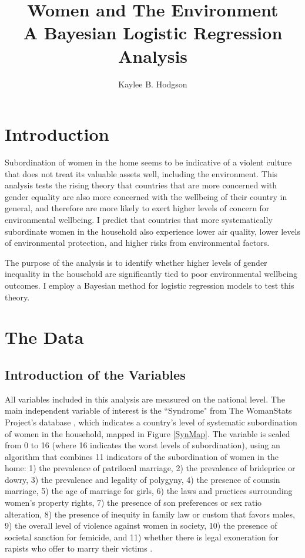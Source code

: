 \documentclass[letterpaper,10.5pt]{article}
\begin{document}
\title{Women and The Environment \\
      \large{A Bayesian Logistic Regression Analysis}}
\author{Kaylee B. Hodgson} 

\maketitle

\section{Introduction}

Subordination of women in the home seems to be indicative of a violent culture that does not treat its valuable assets well, including the environment. This analysis tests the rising theory that countries that are more concerned with gender equality are also more concerned with the wellbeing of their country in general, and therefore are more likely to exert higher levels of concern for environmental wellbeing. I predict that countries that more systematically subordinate women in the household also experience lower air quality, lower levels of environmental protection, and higher risks from environmental factors.

The purpose of the analysis is to identify whether higher levels of gender inequality in the household are significantly tied to poor environmental wellbeing outcomes. I employ a Bayesian method for logistic regression models to test this theory. 

\section{The Data}

\subsection{Introduction of the Variables}

All variables included in this analysis are measured on the national level. The main independent variable of interest is the ``Syndrome" from The WomanStats Project's database \cite{womanstats}, which indicates a country's level of systematic subordination of women in the household, mapped in Figure \ref{SynMap}. The variable is scaled from 0 to 16 (where 16 indicates the worst levels of subordination), using an algorithm that combines 11 indicators of the subordination of women in the home: 1) the prevalence of patrilocal marriage, 2) the prevalence of brideprice or dowry, 3) the prevalence and legality of polygyny, 4) the presence of counsin marriage, 5) the age of marriage for girls, 6) the laws and practices surrounding women's property rights, 7) the presence of son preferences or sex ratio alteration, 8) the presence of inequity in family law or custom that favors males, 9) the overall level of violence against women in society, 10) the presence of societal sanction for femicide, and 11) whether there is legal exoneration for rapists who offer to marry their victims \cite{womanstats}. 
\end{document}
